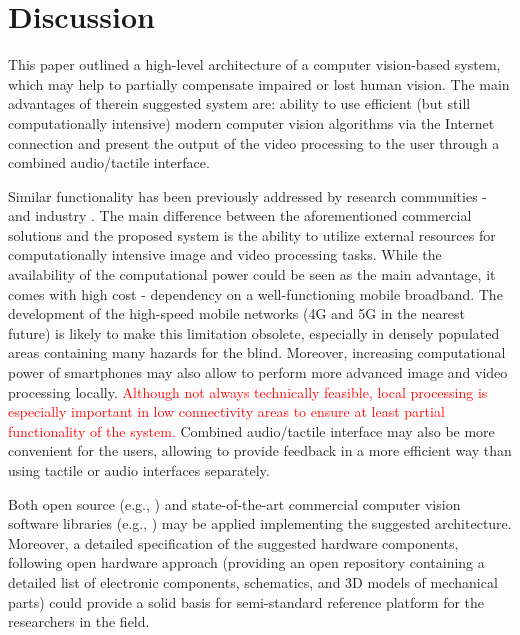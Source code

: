 \documentclass[10pt,conference,compsocconf]{IEEEtran}
\begin{document}
 
\section{Discussion}
\label{sec:discussion}


This paper outlined a high-level architecture of a computer vision-based system, which may help to partially compensate impaired or lost human vision. The main advantages of therein suggested system are: ability to use efficient (but still computationally intensive) modern computer vision algorithms via the Internet connection and present the output of the video processing to the user through a combined audio/tactile interface. 

Similar functionality has been previously addressed by research communities \cite{Caraiman}-\cite{Zientara} and industry \cite{orcam}\cite{horus}. The main difference between the aforementioned commercial solutions and the proposed system is the ability to utilize external resources for computationally intensive image and video processing tasks. While the availability of the computational power could be seen as the main advantage, it comes with high cost - dependency on a well-functioning mobile broadband. The development of the high-speed mobile networks (4G and 5G in the nearest future) is likely to make this limitation obsolete, especially in densely populated areas containing many hazards for the blind. Moreover, increasing computational power of smartphones may also allow to perform more advanced image and video processing locally. \textcolor{red}{Although not always technically feasible, local  processing is especially important in low connectivity areas to ensure at least partial functionality of the system.} Combined audio/tactile interface may also be more convenient for the users, allowing to provide feedback in a more efficient way than using tactile or audio interfaces separately. 

Both open source (e.g., \cite{Tensorflow}) and state-of-the-art commercial computer vision software libraries (e.g., \cite{Verilook}) may be applied implementing the suggested architecture. Moreover, a detailed specification of the suggested hardware components, following open hardware approach (providing an open repository containing a detailed list of electronic components, schematics, and 3D models of mechanical parts) could provide a solid basis for semi-standard reference platform for the researchers in the field.
\end{document}
